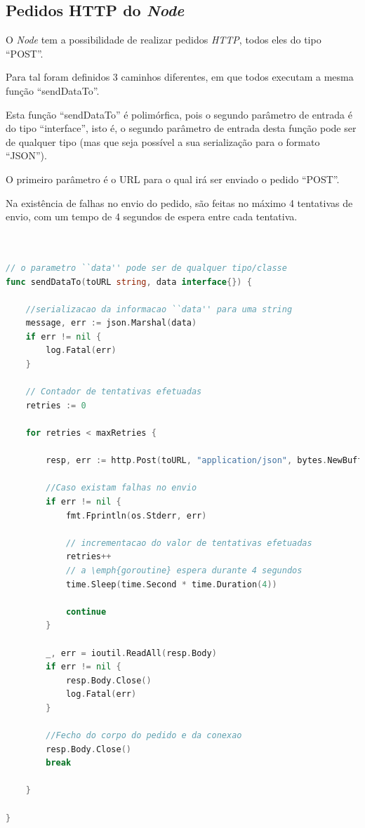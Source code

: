 \subsection*{Pedidos \acs{HTTP} do \emph{Node}}
O \emph{Node} tem a possibilidade de realizar pedidos \emph{HTTP}, todos eles do tipo ``POST''.

Para tal foram definidos 3 caminhos diferentes, em que todos executam a mesma função ``sendDataTo''.

Esta função ``sendDataTo'' é polimórfica, pois o segundo parâmetro de entrada é do tipo ``interface'', isto é, o segundo parâmetro
de entrada desta função pode ser de qualquer tipo (mas que seja possível a sua serialização para o formato ``JSON'').

O primeiro parâmetro é o \acs{URL} para o qual irá ser enviado o pedido ``POST''.

Na existência de falhas no envio do pedido, são feitas no máximo 4 tentativas de envio, com um tempo de 4 segundos de espera entre cada tentativa.
\begin{lstlisting}[caption={Método ``sendDataTo'' para envio de dados para outros \emph{Nodes}},language=Go]


// o parametro ``data'' pode ser de qualquer tipo/classe
func sendDataTo(toURL string, data interface{}) {

	//serializacao da informacao ``data'' para uma string
	message, err := json.Marshal(data)
	if err != nil {
		log.Fatal(err)
	}

	// Contador de tentativas efetuadas
	retries := 0

	for retries < maxRetries {

		resp, err := http.Post(toURL, "application/json", bytes.NewBuffer(message))

		//Caso existam falhas no envio
		if err != nil {
			fmt.Fprintln(os.Stderr, err)

			// incrementacao do valor de tentativas efetuadas
			retries++
			// a \emph{goroutine} espera durante 4 segundos
			time.Sleep(time.Second * time.Duration(4))

			continue
		}

		_, err = ioutil.ReadAll(resp.Body)
		if err != nil {
			resp.Body.Close()
			log.Fatal(err)
		}

		//Fecho do corpo do pedido e da conexao
		resp.Body.Close()
		break

	}

}

\end{lstlisting}


